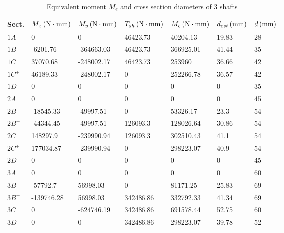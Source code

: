 \begin{table}[ht]
	\centering
	\caption{Equivalent moment $ M_e $ and cross section diameters of 3 shafts}
	\begin{tabular}{lllllll}\toprule
		Sect. & $ M_x\, (\mathrm{N\cdot mm}) $  & $ M_y\, (\mathrm{N\cdot mm}) $ & $ T_{sh}\, (\mathrm{N\cdot mm}) $ & $ M_e\, (\mathrm{N\cdot mm}) $ & $ d_{est}\, (\mathrm{mm}) $ & $ d\, (\mathrm{mm}) $ \\ \midrule
		$ 1A $		&	0			&	0			&	46423.73	& 40204.13	&	19.83	& 28 \\
		$ 1B $		&	-6201.76	&	-364663.03	&	46423.73	& 366925.01	&	41.44	& 35 \\
		$ 1C^- $	&	37070.68	&	-248002.17	&	46423.73	& 253960	&	36.66	& 42 \\
		$ 1C^+ $	&	46189.33	&	-248002.17	&	0			& 252266.78	&	36.57	& 42 \\
		$ 1D $		&	0			&	0			&	0			& 0			&	0		& 35 \\
		$ 2A $		&	0			&	0			&	0			& 0			&	0		& 45 \\
		$ 2B^- $	&	-18545.33	&	-49997.51	&	0			& 53326.17	&	23.3	& 54 \\
		$ 2B^+ $	&	-44344.45	&	-49997.51	&	126093.3	& 128026.64	&	30.86	& 54 \\
		$ 2C^- $	&	148297.9	&	-239990.94	&	126093.3	& 302510.43	&	41.1	& 54 \\
		$ 2C^+ $	&	177034.87	&	-239990.94	&	0			& 298223.07	&	40.9	& 54 \\
		$ 2D $		&	0			&	0			&	0			& 0			&	0		& 45 \\
		$ 3A $		&	0			&	0			&	0			& 0			&	0		& 60 \\
		$ 3B^- $	&	-57792.7	&	56998.03	&	0			& 81171.25	&	25.83	& 69 \\
		$ 3B^+ $	&	-139746.28	&	56998.03	&	342486.86	& 332792.33	&	41.34	& 69 \\
		$ 3C $		&	0			&	-624746.19	&	342486.86	& 691578.44	&	52.75	& 60 \\
		$ 3D $		&	0			&	0			&	342486.86	& 298223.07	&	39.78	& 52 \\
		\bottomrule
	\end{tabular}
	\label{dia_sh}
\end{table}

